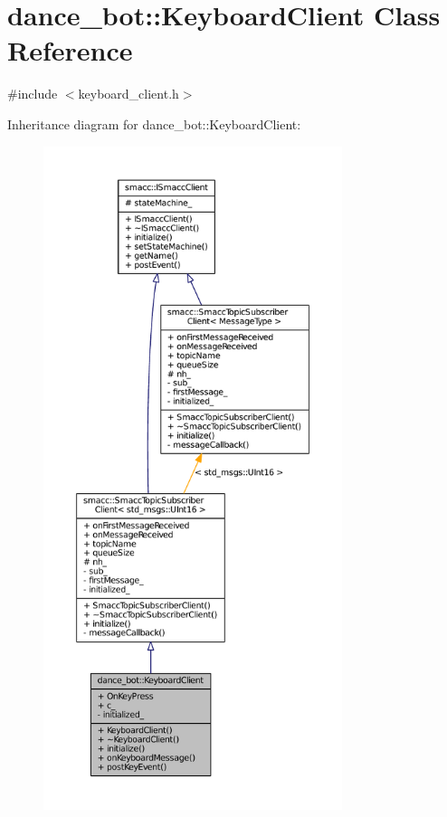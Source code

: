 \hypertarget{classdance__bot_1_1KeyboardClient}{}\section{dance\+\_\+bot\+:\+:Keyboard\+Client Class Reference}
\label{classdance__bot_1_1KeyboardClient}


{\ttfamily \#include $<$keyboard\+\_\+client.\+h$>$}



Inheritance diagram for dance\+\_\+bot\+:\+:Keyboard\+Client\+:
\nopagebreak
\begin{figure}[H]
\begin{center}
\leavevmode
\includegraphics[height=550pt]{classdance__bot_1_1KeyboardClient__inherit__graph}
\end{center}
\end{figure}


